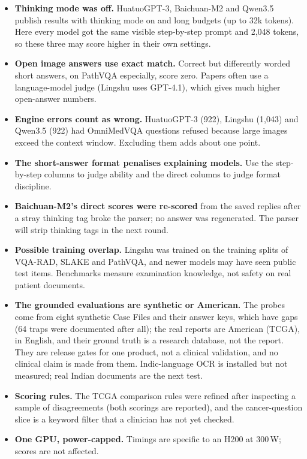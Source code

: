\documentclass{article}
\begin{document}
\begin{itemize}
  \item \textbf{Thinking mode was off.} HuatuoGPT-3, Baichuan-M2 and Qwen3.5 publish results with thinking mode on and long budgets (up to 32k tokens). Here every model got the same visible step-by-step prompt and 2,048 tokens, so these three may score higher in their own settings.
  \item \textbf{Open image answers use exact match.} Correct but differently worded short answers, on PathVQA especially, score zero. Papers often use a language-model judge (Lingshu uses GPT-4.1), which gives much higher open-answer numbers.
  \item \textbf{Engine errors count as wrong.} HuatuoGPT-3 (922), Lingshu (1,043) and Qwen3.5 (922) had OmniMedVQA questions refused because large images exceed the context window. Excluding them adds about one point.
  \item \textbf{The short-answer format penalises explaining models.} Use the step-by-step columns to judge ability and the direct columns to judge format discipline.
  \item \textbf{Baichuan-M2's direct scores were re-scored} from the saved replies after a stray thinking tag broke the parser; no answer was regenerated. The parser will strip thinking tags in the next round.
  \item \textbf{Possible training overlap.} Lingshu was trained on the training splits of VQA-RAD, SLAKE and PathVQA, and newer models may have seen public test items. Benchmarks measure examination knowledge, not safety on real patient documents.
  \item \textbf{The grounded evaluations are synthetic or American.} The probes come from eight synthetic Case Files and their answer keys, which have gaps (64 traps were documented after all); the real reports are American (TCGA), in English, and their ground truth is a research database, not the report. They are release gates for one product, not a clinical validation, and no clinical claim is made from them. Indic-language OCR is installed but not measured; real Indian documents are the next test.
  \item \textbf{Scoring rules.} The TCGA comparison rules were refined after inspecting a sample of disagreements (both scorings are reported), and the cancer-question slice is a keyword filter that a clinician has not yet checked.
  \item \textbf{One GPU, power-capped.} Timings are specific to an H200 at 300\,W; scores are not affected.
\end{itemize}
\end{document}
